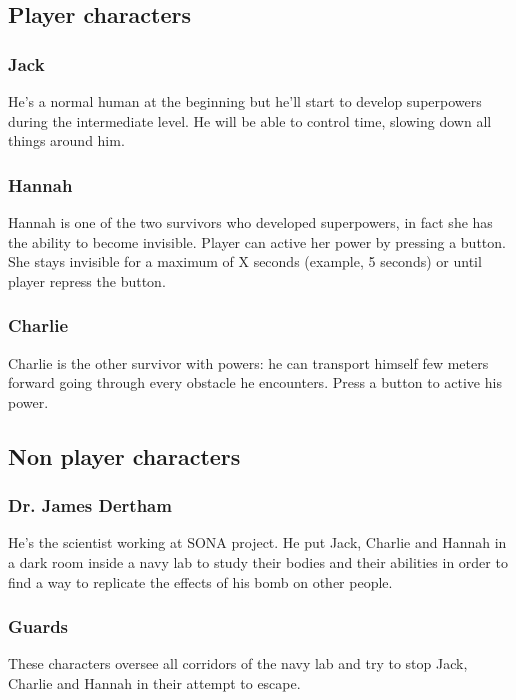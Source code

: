 \subsection{Player characters}
\subsubsection {Jack}
He's a normal human at the beginning but he'll start to develop superpowers during the intermediate level. He will be able to control time, slowing down all things around him.

\subsubsection {Hannah}
Hannah is one of the two survivors who developed superpowers, in fact she has the ability to become invisible. Player can active her power by pressing a button. She stays invisible for a maximum of X seconds (example, 5 seconds) or until player repress the button.

\subsubsection {Charlie}
Charlie is the other survivor with powers: he can transport himself few meters forward going through every obstacle he encounters. Press a button to active his power.

\subsection{Non player characters}
\subsubsection {Dr. James Dertham}
He's the scientist working at SONA project. He put Jack, Charlie and Hannah in a dark room inside a navy lab to study their bodies and their abilities in order to find a way to replicate the effects of his bomb on other people.

\subsubsection {Guards}
These characters oversee all corridors of the navy lab and try to stop Jack, Charlie and Hannah in their attempt to escape.